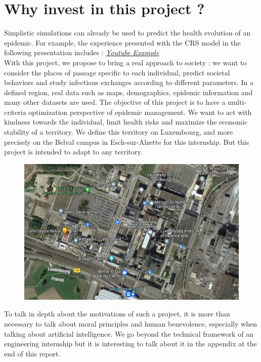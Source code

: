 \section*{Why invest in this project ?}

Simplistic simulations can already be used to predict the health evolution of an epidemic. For example, the experience presented with the CRS model in the following presentation includes : \href{https://www.youtube.com/watch?v=gxAaO2rsdIs}{\textit{Youtube Example}}\\

With this project, we propose to bring a real approach to society : we want to consider the places of passage specific to each individual, predict societal behaviors and study infectious exchanges according to different parameters. In a defined region, real data such as maps, demographics, epidemic information and many other datasets are used. The objective of this project is to have a multi-criteria optimization perspective of epidemic management. We want to act with kindness towards the individual, limit health risks and maximize the economic stability of a territory. We define this territory on Luxembourg, and more precisely on the Belval campus in Esch-sur-Alzette for this internship. But this project is intended to adapt to any territory.\\

\begin{figure}[h]
  \centering
  \includegraphics[width=0.8\linewidth]{media/belval_maps.png}
  \caption{}
  \label{fig:belvalmaps}
\end{figure}

To talk in depth about the motivations of such a project, it is more than necessary to talk about moral principles and human benevolence, especially when talking about artificial intelligence. We go beyond the technical framework of an engineering internship but it is interesting to talk about it in the appendix at the end of this report. \\

